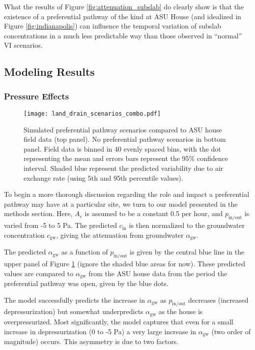 \documentclass[journal=esthag,manuscript=article]{achemso}
\begin{document}
What the results of Figure \ref{fig:attenuation_subslab} do clearly show is that the existence of a preferential pathway of the kind at ASU House (and idealized in Figure \ref{fig:indianapolis}) can influence the temporal variation of subslab concentrations in a much less predictable way than those observed in “normal” VI scenarios.

\subsection{Modeling Results}

\subsubsection{Pressure Effects}

\begin{figure}[htb!]
 \centering
 \caption{Simulated preferential pathway scenarios compared to ASU house field data (top panel). No preferential pathway scenarios in bottom panel. Field data is binned in 40 evenly spaced bins, with the dot representing the mean and errors bars represent the 95\% confidence interval. Shaded blue represent the predicted variability due to air exchange rate (using 5th and 95th percentile values).}\label{fig:land_drain_scenarios}
 \texttt{[image: land\_drain\_scenarios\_combo.pdf]}
\end{figure}

To begin a more thorough discussion regarding the role and impact a preferential pathway may have at a particular site, we turn to our model presented in the methods section.
Here, $A_e$ is assumed to be a constant 0.5 per hour, and $p_\mathrm{in/out}$ is varied from -5 to 5 Pa.
The predicted $c_\mathrm{in}$ is then normalized to the groundwater concentration $c_\mathrm{gw}$, giving the attenuation from groundwater $\alpha_\mathrm{gw}$.

The predicted $\alpha_\mathrm{gw}$ as a function of $p_\mathrm{in/out}$ is given by the central blue line in the upper panel of Figure \ref{fig:land_drain_scenarios} (ignore the shaded blue areas for now).
These predicted values are compared to $\alpha_\mathrm{gw}$ from the ASU house data from the period the preferential pathway was open, given by the blue dots.

The model successfully predicts the increase in $\alpha_\mathrm{gw}$ as $p_\mathrm{in/out}$ decreases (increased depressurization) but somewhat underpredicts $\alpha_\mathrm{gw}$ as the house is overpressurized.
Most significantly, the model captures that even for a small increase in depressurization (0 to -5 Pa) a very large increase in $\alpha_\mathrm{gw}$ (two order of magnitude) occurs.
This asymmetry is due to two factors.
\end{document}
